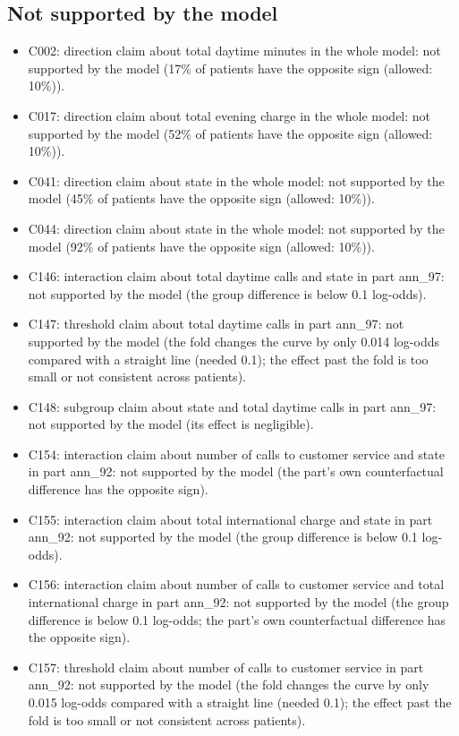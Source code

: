\documentclass[a4paper,10pt]{article}
\newif\ifreviewmarks
\newcommand{\reviewrule}{\noindent{\color{BrickRed}\rule{\linewidth}{0.8pt}}}
\newenvironment{drafted}[1][]{%
  \ifreviewmarks\par\addvspace{\medskipamount}\reviewrule\par\nopagebreak
  \noindent{\color{BrickRed}\sffamily\footnotesize\textbf{Thesis Draft}\quad #1\hfill review}\par\nopagebreak\smallskip\fi}{%
  \ifreviewmarks\par\smallskip\noindent{\color{BrickRed}\sffamily\footnotesize end of thesis draft}\par\nopagebreak\reviewrule\par\medskip\fi}
\begin{document}
\begin{drafted}[plain-language layer: churn100-s2-c1]
\subsection{Not supported by the model}
\begin{itemize}\setlength\itemsep{0pt}\small
\item C002: direction claim about total daytime minutes in the whole model: not supported by the model (17\% of patients have the opposite sign (allowed: 10\%)).
\item C017: direction claim about total evening charge in the whole model: not supported by the model (52\% of patients have the opposite sign (allowed: 10\%)).
\item C041: direction claim about state in the whole model: not supported by the model (45\% of patients have the opposite sign (allowed: 10\%)).
\item C044: direction claim about state in the whole model: not supported by the model (92\% of patients have the opposite sign (allowed: 10\%)).
\item C146: interaction claim about total daytime calls and state in part ann\_\allowbreak{}97: not supported by the model (the group difference is below 0.1 log-odds).
\item C147: threshold claim about total daytime calls in part ann\_\allowbreak{}97: not supported by the model (the fold changes the curve by only 0.014 log-odds compared with a straight line (needed 0.1); the effect past the fold is too small or not consistent across patients).
\item C148: subgroup claim about state and total daytime calls in part ann\_\allowbreak{}97: not supported by the model (its effect is negligible).
\item C154: interaction claim about number of calls to customer service and state in part ann\_\allowbreak{}92: not supported by the model (the part's own counterfactual difference has the opposite sign).
\item C155: interaction claim about total international charge and state in part ann\_\allowbreak{}92: not supported by the model (the group difference is below 0.1 log-odds).
\item C156: interaction claim about number of calls to customer service and total international charge in part ann\_\allowbreak{}92: not supported by the model (the group difference is below 0.1 log-odds; the part's own counterfactual difference has the opposite sign).
\item C157: threshold claim about number of calls to customer service in part ann\_\allowbreak{}92: not supported by the model (the fold changes the curve by only 0.015 log-odds compared with a straight line (needed 0.1); the effect past the fold is too small or not consistent across patients).

\end{itemize}
\end{drafted}
\end{document}
